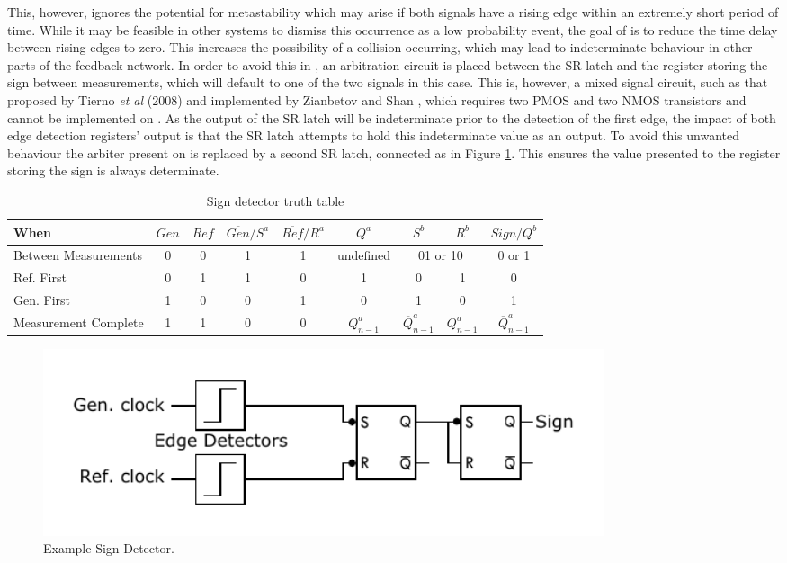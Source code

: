 This, however, ignores the potential for metastability which may arise if both signals have a rising edge within an extremely short period of time. While it may be feasible in other systems to dismiss this occurrence as a low probability event, the goal of  is to reduce the time delay between rising edges to zero. This increases the possibility of a collision occurring, which may lead to indeterminate behaviour in other parts of the feedback network. In order to avoid this in , an arbitration circuit is placed between the \ac{SR} latch and the register storing the sign between measurements, which will default to one of the two signals in this case. This is, however, a mixed signal circuit, such as that proposed by Tierno \textit{et al} (2008) and implemented by Zianbetov and Shan \cite{tierno2008wide,zianbetov2013phd,shan2014phd}, which requires two \ac{PMOS} and two \ac{NMOS} transistors and cannot be implemented on . As the output of the \ac{SR} latch will be indeterminate prior to the detection of the first edge, the impact of both edge detection registers' output is that the \ac{SR} latch attempts to hold this indeterminate value as an output. To avoid this unwanted behaviour the arbiter present on  is replaced by a second \ac{SR} latch, connected as in Figure \ref{fig:arbitration}. This ensures the value presented to the register storing the sign is always determinate.
\begin{table}[!ht]
	\begin{center}
		\setlength{\tabcolsep}{.5\tabcolsep}
		\begin{tabular}{l|cc|cc|c|cc|c}           
			When&$Gen$&$Ref$&$\overline{Gen}/S^a$&$\overline{Ref}/R^a$&$Q^a$&$S^b$&$R^b$&$Sign/Q^b$\\
			\hline
			Between Measurements&0&0&1&1&\multicolumn{1}{c|}{undefined}&\multicolumn{2}{c|}{01 or 10}&\multicolumn{1}{c}{0 or 1}\T\\
			Ref. First&0&1&1&0&1&0&1&0\T\\
			Gen. First&1&0&0&1&0&1&0&1\T\\	
			Measurement Complete&1&1&0&0&$Q^a_{n-1}$&$\overline{Q}^a_{n-1}$&$Q^a_{n-1}$&$\overline{Q}^a_{n-1}$\T\\					
		\end{tabular}
		\caption{Sign detector truth table}
		\label{table:sign_tt}
	\end{center}
\end{table}
\begin{figure}[h]
	\centering
	\includegraphics[width=0.8\textwidth]{../simple_sign_detection}
	\caption[Example Sign Detector]{Example Sign Detector.}
	\label{fig:arbitration}
\end{figure}

